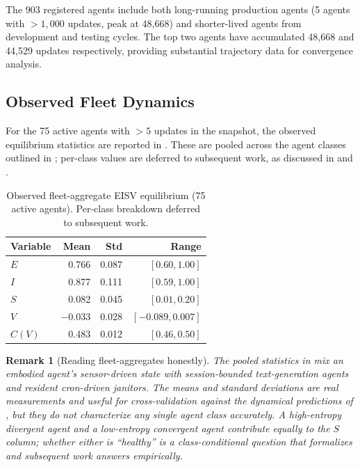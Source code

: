 \documentclass[11pt,twocolumn]{article}
\newtheorem{remark}[theorem]{Remark}
\begin{document}
The 903 registered agents include both long-running production agents
(5 agents with $>1{,}000$ updates, peak at 48{,}668) and shorter-lived
agents from development and testing cycles. The top two agents have
accumulated 48{,}668 and 44{,}529 updates respectively, providing
substantial trajectory data for convergence analysis.


\subsection{Observed Fleet Dynamics}

For the 75 active agents with $>5$ updates in the snapshot, the
observed equilibrium statistics are reported in
. These are pooled across the agent
classes outlined in ; per-class values are
deferred to subsequent work, as discussed in
 and .

\begin{table}[htbp]
\centering
\small
\caption{Observed fleet-aggregate EISV equilibrium (75 active agents). Per-class breakdown deferred to subsequent work.}
\label{tab:eisv-observed}
\begin{tabular}{@{}lrrr@{}}
\toprule
\textbf{Variable} & \textbf{Mean} & \textbf{Std} & \textbf{Range} \\
\midrule
$E$ & 0.766 & 0.087 & $[0.60, 1.00]$ \\
$I$ & 0.877 & 0.111 & $[0.59, 1.00]$ \\
$S$ & 0.082 & 0.045 & $[0.01, 0.20]$ \\
$V$ & $-0.033$ & 0.028 & $[-0.089, 0.007]$ \\
$C(V)$ & 0.483 & 0.012 & $[0.46, 0.50]$ \\
\bottomrule
\end{tabular}
\end{table}

\begin{remark}[Reading fleet-aggregates honestly]
The pooled statistics in  mix an embodied
agent's sensor-driven state with session-bounded text-generation
agents and resident cron-driven janitors. The means and standard
deviations are real measurements and useful for cross-validation
against the dynamical predictions of , but
they do not characterize any single agent class accurately. A
high-entropy divergent agent and a low-entropy convergent agent
contribute equally to the $S$ column; whether either is
``healthy'' is a class-conditional question that
 formalizes and subsequent work
answers empirically.
\end{remark}
\end{document}
